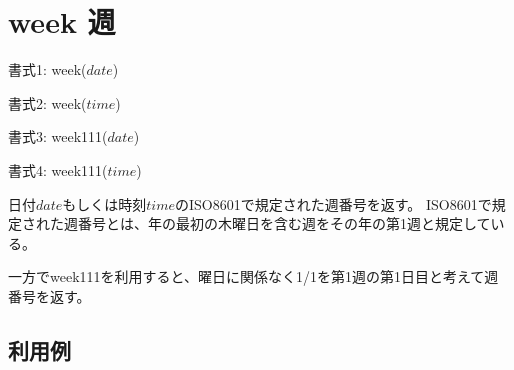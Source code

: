 
%

\section{week 週\label{sect:week}}

書式1: week($date$)

書式2: week($time$)

書式3: week111($date$)

書式4: week111($time$)


日付$date$もしくは時刻$time$のISO8601で規定された週番号を返す。
ISO8601で規定された週番号とは、年の最初の木曜日を含む週をその年の第1週と規定している。

一方でweek111を利用すると、曜日に関係なく1/1を第1週の第1日目と考えて週番号を返す。

\subsection*{利用例}


%

